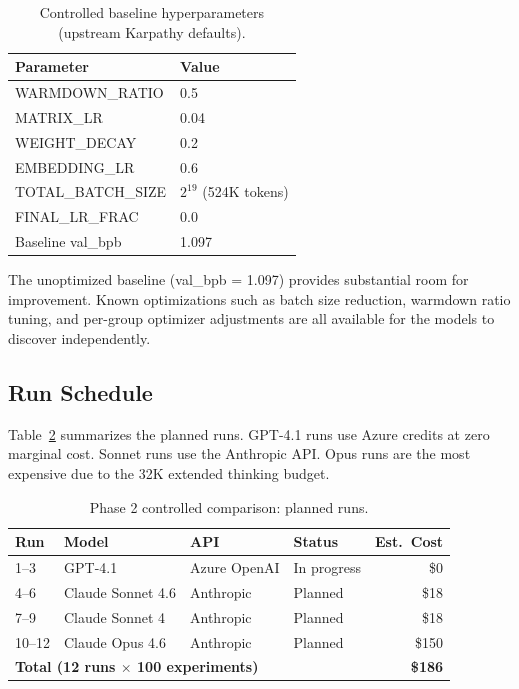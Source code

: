 \documentclass[11pt]{article}
\begin{document}
\begin{table}[H]
\centering
\caption{Controlled baseline hyperparameters (upstream Karpathy defaults).}
\label{tab:phase2_baseline}
\begin{tabular}{ll}
\toprule
\textbf{Parameter} & \textbf{Value} \\
\midrule
WARMDOWN\_RATIO & 0.5 \\
MATRIX\_LR & 0.04 \\
WEIGHT\_DECAY & 0.2 \\
EMBEDDING\_LR & 0.6 \\
TOTAL\_BATCH\_SIZE & $2^{19}$ (524K tokens) \\
FINAL\_LR\_FRAC & 0.0 \\
Baseline val\_bpb & 1.097 \\
\bottomrule
\end{tabular}
\end{table}

The unoptimized baseline (val\_bpb = 1.097) provides substantial room for improvement. Known optimizations such as batch size reduction, warmdown ratio tuning, and per-group optimizer adjustments are all available for the models to discover independently.

\subsection{Run Schedule}
\label{sec:phase2_schedule}

Table~\ref{tab:phase2_runs} summarizes the planned runs. GPT-4.1 runs use Azure credits at zero marginal cost. Sonnet runs use the Anthropic API. Opus runs are the most expensive due to the 32K extended thinking budget.

\begin{table}[H]
\centering
\caption{Phase 2 controlled comparison: planned runs.}
\label{tab:phase2_runs}
\begin{tabular}{llllr}
\toprule
\textbf{Run} & \textbf{Model} & \textbf{API} & \textbf{Status} & \textbf{Est.\ Cost} \\
\midrule
1--3  & GPT-4.1           & Azure OpenAI & In progress & \$0 \\
4--6  & Claude Sonnet 4.6 & Anthropic    & Planned     & \$18 \\
7--9  & Claude Sonnet 4   & Anthropic    & Planned     & \$18 \\
10--12 & Claude Opus 4.6  & Anthropic    & Planned     & \$150 \\
\midrule
\multicolumn{4}{l}{\textbf{Total (12 runs $\times$ 100 experiments)}} & \textbf{\$186} \\
\bottomrule
\end{tabular}
\end{table}
\end{document}
